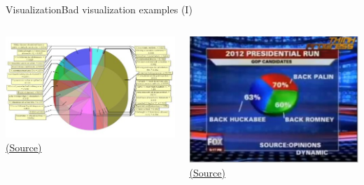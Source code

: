 \documentclass[10pt,compress]{beamer} %
\begin{document}
\begin{frame}{Visualization}{Bad visualization examples (I)}
	\begin{columns}
		\centering \includegraphics[width=\textwidth]{figs/bad2.jpg}\\
		\centering \tiny \href{http://livingqlikview.com/the-9-worst-data-visualizations-ever-created/}{(Source)}

		\centering \includegraphics[width=\textwidth]{figs/bad3.jpg}\\
		\centering \tiny \href{http://livingqlikview.com/the-9-worst-data-visualizations-ever-created/}{(Source)}
	\end{columns}
\end{frame}
\end{document}
